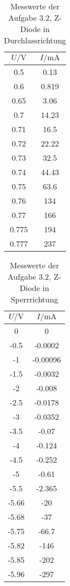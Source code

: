 \documentclass[a4paper, 12pt]{article}
\begin{document}
\begin{multicols}{2}
\begin{center}
  \begin{table}[H]
\begin{center}
\begin{tabular}{@{}c|c@{}}
\toprule
$U / \si{\volt}$     & $I / \si{\milli\ampere}$     \\ \midrule
0.5   & 0.13  \\
0.6   & 0.819 \\
0.65  & 3.06  \\
0.7   & 14.23 \\
0.71  & 16.5  \\
0.72  & 22.22 \\
0.73  & 32.5  \\
0.74  & 44.43 \\
0.75  & 63.6  \\
0.76  & 134   \\
0.77  & 166   \\
0.775 & 194   \\
0.777 & 237   \\ \bottomrule
\end{tabular}
\end{center}
\caption{Messwerte der Aufgabe 3.2, Z-Diode in Durchlassrichtung}
\end{table}
\columnbreak

  \begin{table}[H]
\begin{center}
\begin{tabular}{@{}c|c@{}}
\toprule
$U / \si{\volt}$     & $I / \si{\milli\ampere}$        \\ \midrule
0     & 0        \\
-0.5  & -0.0002  \\
-1    & -0.00096 \\
-1.5  & -0.0032  \\
-2    & -0.008   \\
-2.5  & -0.0178  \\
-3    & -0.0352  \\
-3.5  & -0.07    \\
-4    & -0.124   \\
-4.5  & -0.252   \\
-5    & -0.61    \\
-5.5  & -2.365   \\
-5.66 & -20      \\
-5.68 & -37      \\
-5.75 & -66.7    \\
-5.82 & -146     \\
-5.85 & -202     \\
-5.96 & -297     \\ \bottomrule
\end{tabular}
\end{center}
\caption{Messwerte der Aufgabe 3.2, Z-Diode in Sperrrichtung}
\end{table}

\end{center}
\end{multicols}
\end{document}
